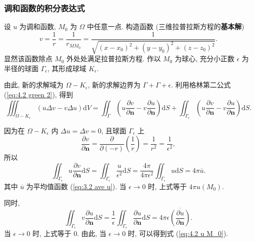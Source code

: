 \subsubsection{调和函数的积分表达式} \label{proofs 4 调和函数的积分表达式}
设 $u$ 为调和函数, $M_0$ 为 $\Omega$ 中任意一点. 构造函数 (三维拉普拉斯方程的\textbf{基本解})
\begin{equation}
    v=\frac{1}{r}=\frac{1}{r_{MM_0}}=\frac{1}{\sqrt{(x-x_0)^2+(y-y_0)^2+(z-z_0)^2}}.
\end{equation}
显然该函数除点 $M_0$ 外处处满足拉普拉斯方程. 作以 $M_0$ 为球心, 充分小正数 $\epsilon$ 为半径的球面 $\Gamma_\epsilon$, 其形成球域 $K_\epsilon$.

由此, 新的求解域为 $\Omega-K_\epsilon$, 新的求解边界为 $\Gamma+\Gamma+\epsilon$. 利用格林第二公式 (\ref{eq:4.2 green 2}), 得到
\begin{equation}
    \iiint_{\Omega-K_\epsilon}(u\Delta v-v\Delta u)\mathrm{d}V=\iint_{\Gamma}\left(u\frac{\partial v}{\partial\boldsymbol{n}}-v\frac{\partial u}{\partial\boldsymbol{n}}\right)\mathrm{d}S+\iint_{\Gamma_\epsilon}\left(u\frac{\partial v}{\partial\boldsymbol{n}}-v\frac{\partial u}{\partial\boldsymbol{n}}\right)\mathrm{d}S.
\end{equation}

因为在 $\Omega-K_\epsilon$ 内 $\Delta u=\Delta v=0$, 且球面 $\Gamma_\epsilon$ 上
\begin{equation*}
    \frac{\partial v}{\partial\boldsymbol{n}}=\frac{\partial}{\partial(-r)}\left(\frac{1}{r}\right)=\frac{1}{r^2}=\frac{1}{\epsilon^2},
\end{equation*}
所以
\begin{equation}
    \iint_{\Gamma_\epsilon}u\frac{\partial v}{\partial\boldsymbol{n}}\mathrm{d}S=\iint_{\Gamma_\epsilon}\frac{u}{\epsilon^2}\mathrm{d}S=\frac{4\pi}{4\pi\epsilon^2}\iint_{\Gamma_\epsilon}u\mathrm{d}S=4\pi\overline{u}.
\end{equation}
其中 $\overline{u}$ 为平均值函数 (\ref{eq:3.2 ave u}). 当 $\epsilon\rightarrow 0$ 时, 上式等于 $4\pi u(M_0)$.

同时,
\begin{equation}
    \iint_{\Gamma_\epsilon}v\frac{\partial u}{\partial\boldsymbol{n}}\mathrm{d}S=\frac{1}{\epsilon}\iint_{\Gamma_\epsilon}\frac{\partial u}{\partial\boldsymbol{n}}\mathrm{d}S=4\pi\epsilon\overline{\left(\frac{\partial u}{\partial\boldsymbol{n}}\right)}.
\end{equation}
当 $\epsilon\rightarrow 0$ 时, 上式等于 $0$. 由此, 当 $\epsilon\rightarrow 0$ 时, 可以得到式 (\ref{eq:4.2 u M_0}).
